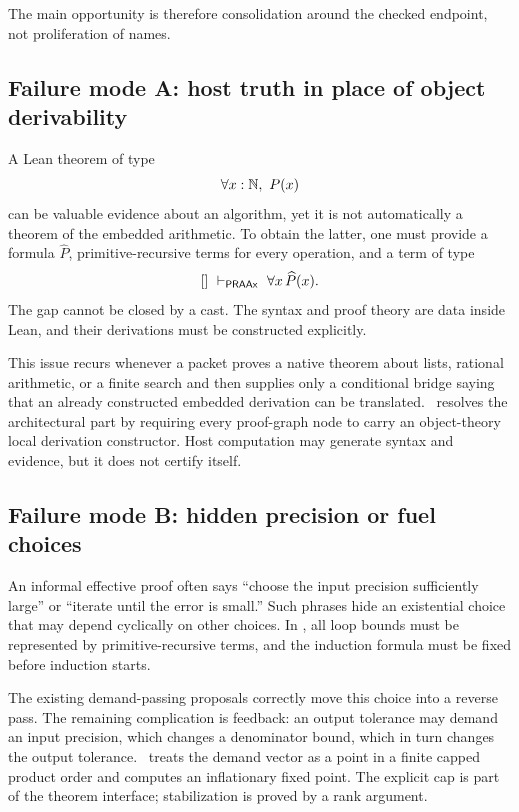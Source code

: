 The main opportunity is therefore consolidation around the checked endpoint, not proliferation of names.

\subsection{Failure mode A: host truth in place of object derivability}

A Lean theorem of type
\[
   \forall x:\Nat,\ P(x)
\]
can be valuable evidence about an algorithm, yet it is not automatically a theorem of the embedded arithmetic.  To obtain the latter, one must provide a formula \(\widehat P\), primitive-recursive terms for every operation, and a term of type
\[
  []\ \vdash_{\mathsf{PRAAx}}\ \forall x\,\widehat P(x).
\]
The gap cannot be closed by a cast.  The syntax and proof theory are data inside Lean, and their derivations must be constructed explicitly.

This issue recurs whenever a packet proves a native theorem about lists, rational arithmetic, or a finite search and then supplies only a conditional bridge saying that an already constructed embedded derivation can be translated.  \CIFER\ resolves the architectural part by requiring every proof-graph node to carry an object-theory local derivation constructor.  Host computation may generate syntax and evidence, but it does not certify itself.

\subsection{Failure mode B: hidden precision or fuel choices}

An informal effective proof often says ``choose the input precision sufficiently large'' or ``iterate until the error is small.''  Such phrases hide an existential choice that may depend cyclically on other choices.  In \iPRA, all loop bounds must be represented by primitive-recursive terms, and the induction formula must be fixed before induction starts.

The existing demand-passing proposals correctly move this choice into a reverse pass.  The remaining complication is feedback: an output tolerance may demand an input precision, which changes a denominator bound, which in turn changes the output tolerance.  \CIFER\ treats the demand vector as a point in a finite capped product order and computes an inflationary fixed point.  The explicit cap is part of the theorem interface; stabilization is proved by a rank argument.

